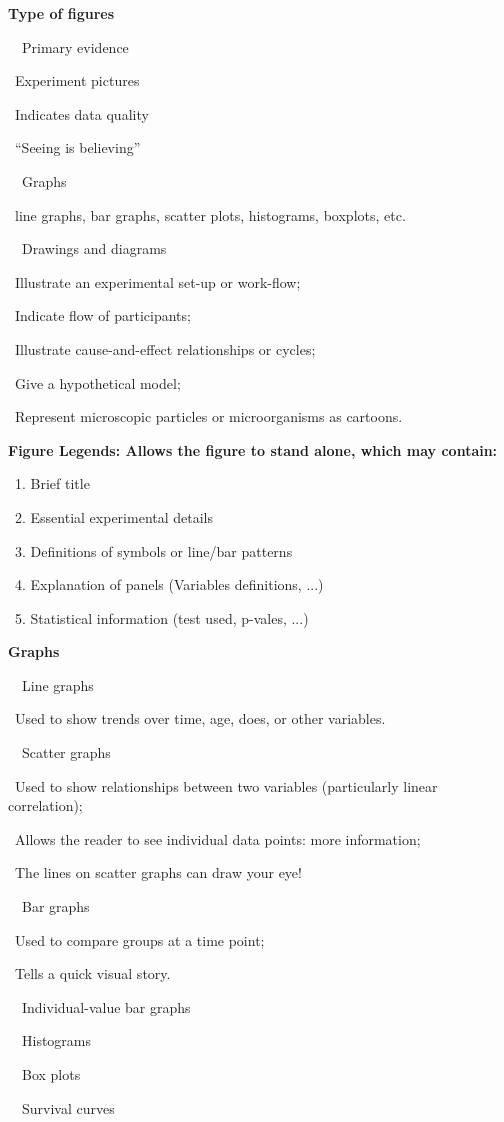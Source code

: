 \documentclass[a4paper, 12pt]{article}
\begin{document}
\textbf{Type of figures}
\par\ \textbullet\ Primary evidence
\par\quad\textopenbullet\ Experiment pictures
\par\quad\textopenbullet\ Indicates data quality
\par\quad\textopenbullet\ ``Seeing is believing''
\par\ \textbullet\ Graphs
\par\quad\textopenbullet\ line graphs, bar graphs, scatter plots, histograms, boxplots, etc.
\par\ \textbullet\ Drawings and diagrams
\par\quad\textopenbullet\ Illustrate an experimental set-up or work-flow;
\par\quad\textopenbullet\ Indicate flow of participants;
\par\quad\textopenbullet\ Illustrate cause-and-effect relationships or cycles;
\par\quad\textopenbullet\ Give a hypothetical model;
\par\quad\textopenbullet\ Represent microscopic particles or microorganisms as cartoons.

\textbf{Figure Legends: Allows the figure to stand alone, which may contain:}
\par\ 1. Brief title
\par\ 2. Essential experimental details
\par\ 3. Definitions of symbols or line/bar patterns
\par\ 4. Explanation of panels (Variables definitions, ...)
\par\ 5. Statistical information (test used, p-vales, ...)

\newpage\textbf{Graphs}
\par\ \textbullet\ Line graphs
\par\quad\textopenbullet\ Used to show trends over time, age, does, or other variables.
\par\ \textbullet\ Scatter graphs
\par\quad\textopenbullet\ Used to show relationships between two variables (particularly linear correlation);
\par\quad\textopenbullet\ Allows the reader to see individual data points: more information;
\par\quad\textopenbullet\ The lines on scatter graphs can draw your eye!
\par\ \textbullet\ Bar graphs
\par\quad\textopenbullet\ Used to compare groups at a time point;
\par\quad\textopenbullet\ Tells a quick visual story.
\par\ \textbullet\ Individual-value bar graphs
\par\ \textbullet\ Histograms
\par\ \textbullet\ Box plots
\par\ \textbullet\ Survival curves
\end{document}
